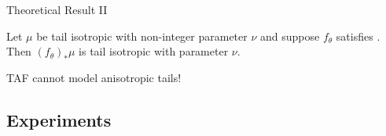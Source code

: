 
\begin{frame}{Theoretical Result II}
    \begin{proposition}
      \label{prop:isotropic-pushforward}
      Let $\mu$ be tail isotropic with non-integer parameter $\nu$
      and suppose $f_\theta$ satisfies .
      Then $(f_\theta)_\ast \mu$ is tail isotropic with parameter $\nu$.
    \end{proposition}
    
    \therefore\quad TAF cannot model anisotropic tails!

\end{frame}

\subsection{Experiments}

